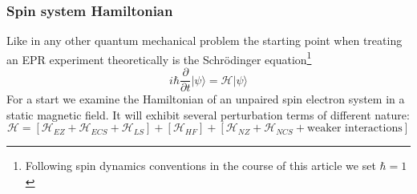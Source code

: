 \documentclass[11.5pt,a4paper]{article}
\begin{document}
\subsubsection{Spin system Hamiltonian}
Like in any other quantum mechanical problem the starting point when treating an EPR experiment theoretically is the Schr\"odinger equation\footnote{Following spin dynamics conventions in the course of this article we set $\hbar = 1$}
\begin{equation}
 i \hbar \frac{\partial}{\partial t} |\psi\rangle = \mathcal{H} |\psi \rangle
\end{equation}
 For a start we examine the Hamiltonian of an unpaired spin electron system in a static magnetic field. It will exhibit several perturbation terms of different nature:
\begin{equation}
 \mathcal{H} = \left[\mathcal{H}_{EZ} + \mathcal{H}_{ECS} + \mathcal{H}_{LS}\right] + \left[\mathcal{H}_{HF}\right] + \left[\mathcal{H}_{NZ} + \mathcal{H}_{NCS} + \text{weaker interactions}\right]
\end{equation}
\end{document}
